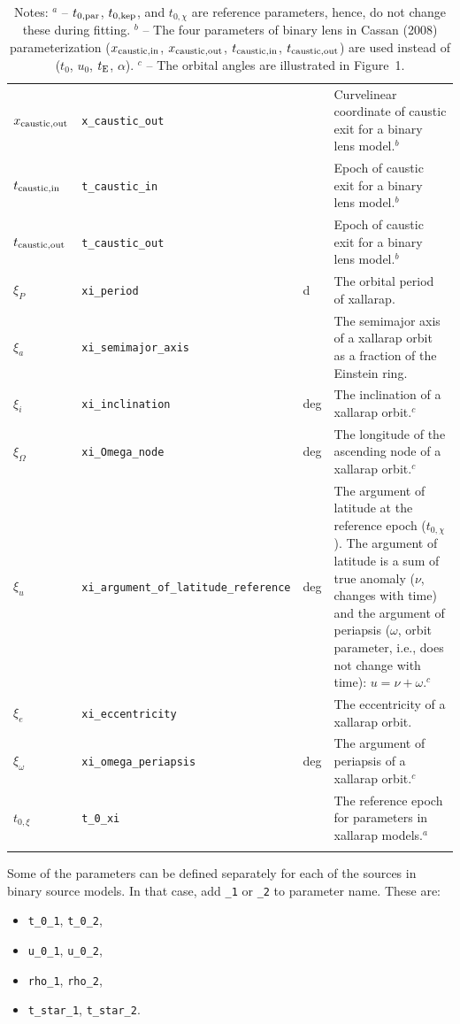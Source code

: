 \documentclass[12pt]{article}
\begin{document}
\begin{landscape}
\begin{longtable}{l l l p{12cm}}
$x_{\rm caustic, out}$ & {\tt x\_caustic\_out} & & Curvelinear coordinate of caustic exit for a binary lens model.$^b$ \\
$t_{\rm caustic, in}$ & {\tt t\_caustic\_in} & & Epoch of caustic exit for a binary lens model.$^b$ \\
$t_{\rm caustic, out}$ & {\tt t\_caustic\_out} & & Epoch of caustic exit for a binary lens model.$^b$ \\
$\xi_P$ & \texttt{xi\_period} & d & The orbital period of xallarap.\\
$\xi_a$ & \texttt{xi\_semimajor\_axis} & & The semimajor axis of a xallarap orbit as a fraction of the Einstein ring.\\
$\xi_i$ & \texttt{xi\_inclination} & deg & The inclination of a xallarap orbit.$^c$\\
$\xi_\Omega$ & \texttt{xi\_Omega\_node} & deg & The longitude of the ascending node of a xallarap orbit.$^c$\\
$\xi_u$ & \texttt{xi\_argument\_of\_latitude\_reference} & deg & The argument of latitude at the reference epoch ($t_{0,\chi}$). The argument of latitude is a sum of true anomaly ($\nu$, changes with time) and the argument of periapsis ($\omega$, orbit parameter, i.e., does not change with time): $u = \nu + \omega$.$^c$\\
$\xi_e$ & \texttt{xi\_eccentricity} & & The eccentricity of a xallarap orbit.\\
$\xi_\omega$ & \texttt{xi\_omega\_periapsis} & deg & The argument of periapsis of a xallarap orbit.$^c$\\
$t_{0,\xi}$ & \texttt{t\_0\_xi} & &  The reference epoch for parameters in xallarap models.$^a$\\
\hline
\caption{Notes: \newline
$^a$ -- $t_{0,{\rm par}}$, $t_{0,{\rm kep}}$, and $t_{0,\chi}$ are reference parameters, hence, do not change these during fitting. \newline
$^b$ -- The four parameters of binary lens in Cassan (2008) parameterization ($x_{\rm caustic, in}$, $x_{\rm caustic, out}$, $t_{\rm caustic, in}$, $t_{\rm caustic, out}$) are used instead of ($t_0$, $u_0$, $t_{\rm E}$, $\alpha$). \newline
$^c$ -- The orbital angles are illustrated in Figure~1.
}
\end{longtable}
\end{landscape}

Some of the parameters can be defined separately for each of the sources in binary source models.  
In that case, add {\tt \_1} or {\tt \_2} to parameter name. These are:
\begin{itemize}
\item {\tt t\_0\_1}, {\tt t\_0\_2},
\item {\tt u\_0\_1}, {\tt u\_0\_2},
\item {\tt rho\_1}, {\tt rho\_2},
\item {\tt t\_star\_1}, {\tt t\_star\_2}.
\end{itemize}
\end{document}
